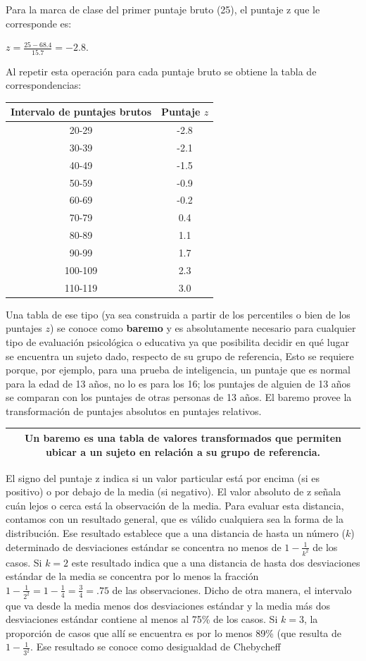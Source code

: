 \documentclass[]{book}
\begin{document}
Para la marca de clase del primer puntaje bruto (25), el puntaje z que le corresponde es:

\(z = \frac{25 - 68.4}{15.7} = - 2.8\).

Al repetir esta operación para cada puntaje bruto se obtiene la tabla de correspondencias:

\begin{longtable}[]{@{}cc@{}}
\toprule
Intervalo de puntajes brutos & Puntaje \(z\)\tabularnewline
\midrule
\endhead
20-29 & -2.8\tabularnewline
30-39 & -2.1\tabularnewline
40-49 & -1.5\tabularnewline
50-59 & -0.9\tabularnewline
60-69 & -0.2\tabularnewline
70-79 & 0.4\tabularnewline
80-89 & 1.1\tabularnewline
90-99 & 1.7\tabularnewline
100-109 & 2.3\tabularnewline
110-119 & 3.0\tabularnewline
\bottomrule
\end{longtable}

Una tabla de ese tipo (ya sea construida a partir de los percentiles o bien de los puntajes \(z\)) se conoce como \textbf{baremo} y es absolutamente necesario para cualquier tipo de evaluación psicológica o educativa ya que posibilita decidir en qué lugar se encuentra un sujeto dado, respecto de su grupo de referencia, Esto se requiere porque, por ejemplo, para una prueba de inteligencia, un puntaje que es normal para la edad de 13 años, no lo es para los 16; los puntajes de alguien de 13 años se comparan con los puntajes de otras personas de 13 años. El baremo provee la transformación de puntajes absolutos en puntajes relativos.

\begin{longtable}[]{@{}c@{}}
\toprule
\endhead
\begin{minipage}[t]{0.97\columnwidth}\centering
Un \textbf{baremo} es una tabla de valores transformados que permiten ubicar a un sujeto en relación a su grupo de referencia.\strut
\end{minipage}\tabularnewline
\bottomrule
\end{longtable}

El signo del puntaje z indica si un valor particular está por encima (si es positivo) o por debajo de la media (si negativo). El valor absoluto de z señala cuán lejos o cerca está la observación de la media. Para evaluar esta distancia, contamos con un resultado general, que es válido cualquiera sea la forma de la distribución. Ese resultado establece que a una distancia de hasta un número (\(k\)) determinado de desviaciones estándar se concentra no menos de \(1-\frac{1}{k^2}\) de los casos. Si \(k=2\) este resultado indica que a una distancia de hasta dos desviaciones estándar de la media se concentra por lo menos la fracción \(1-\frac{1}{2^2}=1-\frac{1}{4}=\frac{3}{4}=.75\) de las observaciones. Dicho de otra manera, el intervalo que va desde la media menos dos desviaciones estándar y la media más dos desviaciones estándar contiene al menos al 75\% de los casos. Si \(k=3\), la proporción de casos que allí se encuentra es por lo menos 89\% (que resulta de \(1-\frac{1}{3^2}\).
Ese resultado se conoce como desigualdad de Chebycheff
\end{document}
